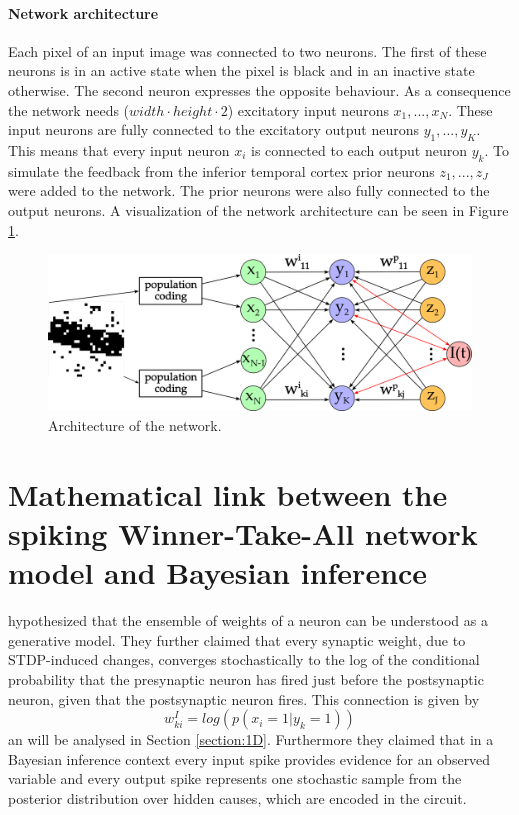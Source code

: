 \paragraph{Network architecture}
Each pixel of an input image was connected to two neurons. The first of these neurons is in an active state when the pixel is black and in an inactive state otherwise. The second neuron expresses the opposite behaviour. As a consequence the network needs ($width \cdot height \cdot 2$) excitatory input neurons $x_1,...,x_N$. These input neurons are fully connected to the excitatory output neurons $y_1,...,y_K$. This means that every input neuron $x_i$ is connected to each output neuron $y_k$. 
To simulate the feedback from the inferior temporal cortex prior neurons $z_1,...,z_J$ were added to the network. The prior neurons were also fully connected to the output neurons. A visualization of the network architecture can be seen in Figure \ref{fig:networkArchitecture}.

\begin{figure}
  \label{fig:networkArchitecture}
  \includegraphics[width=\linewidth]{figures/networkPlan.png}
  \caption{Architecture of the network.}
\end{figure}

\section{Mathematical link between the spiking Winner-Take-All network model and Bayesian inference}
\label{linkNetworkBayes}

\citet{nessler} hypothesized that the ensemble of weights of a neuron can be understood as a generative model. They further claimed that every synaptic weight, due to STDP-induced changes,  converges stochastically to the log of the conditional probability that the presynaptic neuron has fired just before the postsynaptic neuron, given that the postsynaptic neuron fires. This connection is given by
\begin{equation}
 w^{I}_{ki} = log(p(x_i = 1 | y_k = 1))
\end{equation}
an will be analysed in Section \ref{section:1D}.
Furthermore they claimed that in a Bayesian inference context every input spike provides evidence for an observed variable and every output spike represents one stochastic sample from the posterior distribution over hidden causes, which are encoded in the circuit. 

